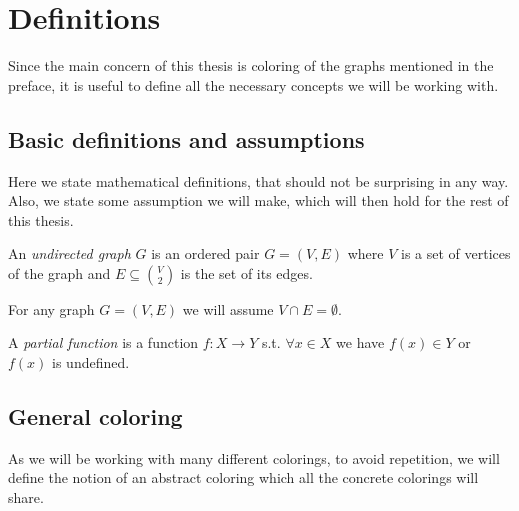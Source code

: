 \chapter{Definitions}

Since the main concern of this thesis is coloring of the graphs mentioned in the preface, it is useful to define all the necessary concepts we will be working with.

\section{Basic definitions and assumptions}

Here we state mathematical definitions, that should not be surprising in any way. Also, we state some assumption we will make, which will then hold for the rest of this thesis.

\begin{definition}
    An \textit{undirected graph} $G$ is an ordered pair $G=(V,E)$ where $V$ is a set of vertices of the graph and $E \subseteq \binom{V}{2}$ is the set of its edges. 
\end{definition}

\begin{assumption}
    For any graph $G=(V,E)$ we will assume $V \cap E = \emptyset$. 
\end{assumption}

\begin{definition}
    A \textit{partial function} is a function $f:X \rightarrow Y$ s.t. $\forall x \in X$ we have $f(x) \in Y$ or $f(x)$ is undefined.
\end{definition}

\section{General coloring}

As we will be working with many different colorings, to avoid repetition, we will define the notion of an abstract coloring which all the concrete colorings will share.


